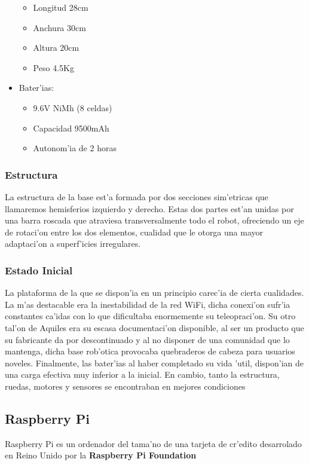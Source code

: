 \documentclass[twoside,12pt]{article}
\begin{document}
\begin{multicols}{2}
\begin{itemize}
\begin{itemize}
	\item Longitud 28cm
	\item Anchura 30cm
	\item Altura 20cm
	\item Peso 4.5Kg
	\end{itemize}
\item Bater'ias:
	\begin{itemize}
	\item 9.6V NiMh (8 celdas)
	\item Capacidad 9500mAh
	\item Autonom'ia de 2 horas
	\end{itemize}
\end{itemize}
\end{multicols}

\subsubsection{Estructura}

La estructura de la base est'a formada por dos secciones sim'etricas que llamaremos hemisferios izquierdo y derecho. Estas dos partes est'an unidas por una barra roscada que atraviesa transversalmente todo el robot, ofreciendo un eje de rotaci'on entre los dos elementos, cualidad que le otorga una mayor adaptaci'on a superf'icies irregulares.

\subsubsection{Estado Inicial}  
La plataforma de la que se dispon'ia en un principio carec'ia de cierta cualidades. La m'as destacable era la inestabilidad de la red WiFi, dicha conexi'on sufr'ia constantes ca'idas con lo que dificultaba enormemente su teleopraci'on. Su otro tal'on de Aquiles era su escasa documentaci'on disponible, al ser un producto que su fabricante da por descontinuado y al no disponer de una comunidad que lo mantenga, dicha base rob'otica provocaba quebraderos de cabeza para usuarios noveles. Finalmente, las bater'ias al haber completado su vida 'util, dispon'ian de una carga efectiva muy inferior a la inicial. En cambio, tanto la estructura, ruedas, motores y sensores se encontraban en mejores condiciones

\subsection{Raspberry Pi}
Raspberry Pi es un ordenador del tama'no de una tarjeta de cr'edito desarrolado en Reino Unido por la \textbf{Raspberry Pi Foundation}
\newpage
\end{document}
